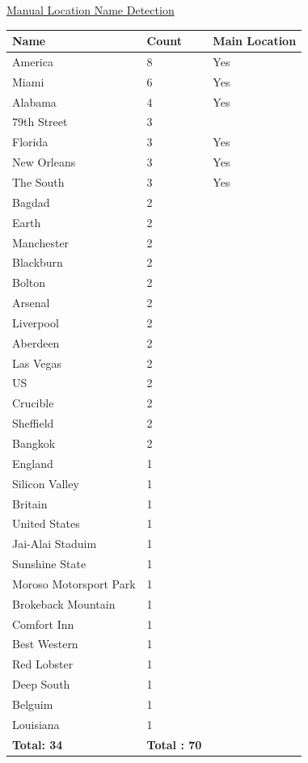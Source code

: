\newpage
\underline{Manual Location Name Detection}

\begin{center}
\begin{tabular}{|p{120pt}|p{90pt}|p{180pt}|}
\hline
\textbf{Name}			&\textbf{Count}		&\textbf{Main Location} 
\\\hline
America				&8				&Yes
\\\hline
Miami				&6				&Yes
\\\hline
Alabama				&4				&Yes
\\\hline
79th Street				&3				&
\\\hline
Florida				&3				&Yes
\\\hline
New Orleans			&3				&Yes
\\\hline
The South				&3				&Yes
\\\hline
Bagdad				&2				&
\\\hline
Earth				&2				&	
\\\hline
Manchester			&2				&	
\\\hline
Blackburn				&2				&
\\\hline
Bolton				&2				&	
\\\hline
Arsenal				&2				&	
\\\hline
Liverpool				&2				&	
\\\hline
Aberdeen				&2				&	
\\\hline
Las Vegas				&2				&	
\\\hline
US					&2				&	
\\\hline
Crucible				&2				&	
\\\hline
Sheffield				&2				&	
\\\hline
Bangkok				&2				&	
\\\hline
England				&1				&	
\\\hline
Silicon Valley			&1				&	
\\\hline
Britain				&1				&	
\\\hline
United States			&1				&
\\\hline
Jai-Alai Staduim		&1				&
\\\hline
Sunshine State			&1				&
\\\hline
Moroso Motorsport Park	&1				&	
\\\hline
Brokeback Mountain	&1				&	
\\\hline
Comfort Inn			&1				&	
\\\hline
Best Western			&1				&	
\\\hline
Red Lobster			&1				&	
\\\hline
Deep South			&1				&	
\\\hline
Belguim				&1				&	
\\\hline
Louisiana				&1				&	
\\\hline
\textbf{Total: 34}		&\textbf{Total : 70}	&
\\\hline
\end{tabular}
\end{center}

